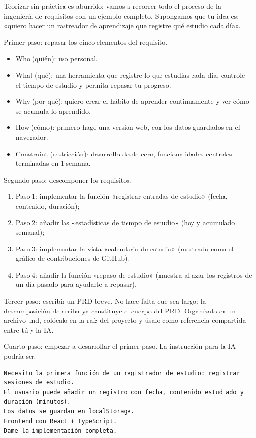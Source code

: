 
Teorizar sin práctica es aburrido; vamos a recorrer todo el proceso de la ingeniería de requisitos con un ejemplo completo. Supongamos que tu idea es: «quiero hacer un rastreador de aprendizaje que registre qué estudio cada día».

Primer paso: repasar los cinco elementos del requisito.

\begin{itemize}
  \item Who (quién): uso personal.
  \item What (qué): una herramienta que registre lo que estudias cada día, controle el tiempo de estudio y permita repasar tu progreso.
  \item Why (por qué): quiero crear el hábito de aprender continuamente y ver cómo se acumula lo aprendido.
  \item How (cómo): primero hago una versión web, con los datos guardados en el navegador.
  \item Constraint (restricción): desarrollo desde cero, funcionalidades centrales terminadas en 1 semana.
\end{itemize}

Segundo paso: descomponer los requisitos.

\begin{enumerate}
  \item Paso 1: implementar la función «registrar entradas de estudio» (fecha, contenido, duración);
  \item Paso 2: añadir las «estadísticas de tiempo de estudio» (hoy y acumulado semanal);
  \item Paso 3: implementar la vista «calendario de estudio» (mostrada como el gráfico de contribuciones de GitHub);
  \item Paso 4: añadir la función «repaso de estudio» (muestra al azar los registros de un día pasado para ayudarte a repasar).
\end{enumerate}

Tercer paso: escribir un PRD breve. No hace falta que sea largo: la descomposición de arriba ya constituye el cuerpo del PRD. Organízalo en un archivo .md, colócalo en la raíz del proyecto y úsalo como referencia compartida entre tú y la IA.

Cuarto paso: empezar a desarrollar el primer paso. La instrucción para la IA podría ser:

\begin{lstlisting}
Necesito la primera función de un registrador de estudio: registrar sesiones de estudio.
El usuario puede añadir un registro con fecha, contenido estudiado y duración (minutos).
Los datos se guardan en localStorage.
Frontend con React + TypeScript.
Dame la implementación completa.
\end{lstlisting}

